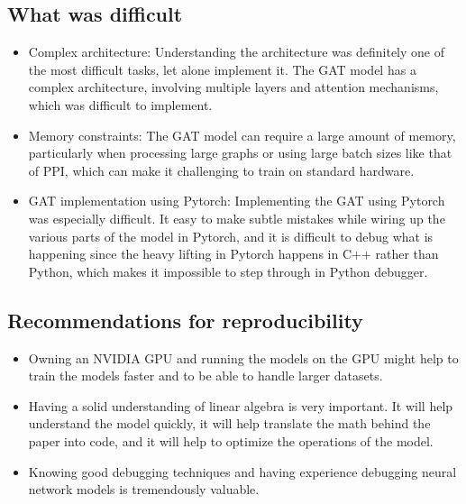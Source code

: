 \subsection{What was difficult}\label{subsec:what-was-difficult}
\begin{itemize}
    \item Complex architecture: Understanding the architecture was definitely one of the most difficult tasks, let alone implement it.
    The GAT model has a complex architecture, involving multiple layers and attention mechanisms, which was difficult to
    implement.
    \item Memory constraints: The GAT model can require a large amount of memory,
    particularly when processing large graphs or using large batch sizes like that of PPI, which can make it challenging
    to train on standard hardware.
    \item GAT implementation using Pytorch: Implementing the GAT using Pytorch was especially difficult. It easy to make subtle mistakes while wiring up the various parts of the model in Pytorch, and it is difficult to debug what is happening since the heavy lifting in Pytorch happens in C++ rather than Python, which makes it impossible to step through in Python debugger.

\end{itemize}
\subsection{Recommendations for reproducibility}\label{subsec:recommendations}
\begin{itemize}
    \item Owning an NVIDIA GPU and running the models on the GPU might help to train the models faster and to be able to handle larger datasets.
    \item Having a solid understanding of linear algebra is very important. It will help understand the model quickly, it will help translate the math behind the paper into code, and it will help to optimize the operations of the model.
    \item Knowing good debugging techniques and having experience debugging neural network models is tremendously valuable.
\end{itemize}
